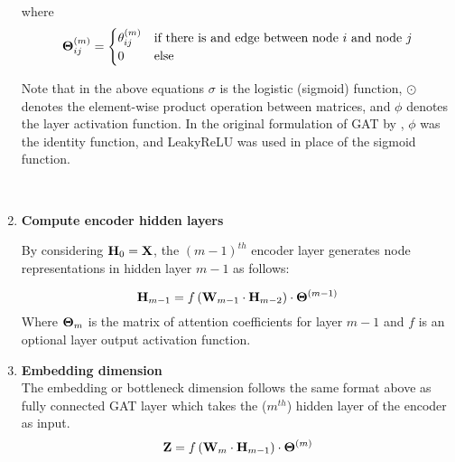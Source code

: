 \documentclass[a4paper,12pt]{article}
\begin{document}
\begin{enumerate}
{					where
					\[ {\bf \Theta}_{ij}^{(m)} = \begin{cases} \theta_{ij}^{(m)} & \text{if there is and edge between node $i$ and node $j$} \\ 0 & \text{else}\end{cases} \]
					
					Note that in the above equations $\sigma$ is the logistic (sigmoid) function, $\odot$ denotes the element-wise product operation between matrices, and $\phi$ denotes the layer activation function. In the original formulation of GAT by \cite{velivckovic2017graph}, $\phi$ was the identity function, and LeakyReLU was used in place of the sigmoid function.}\\
					
				\item[]{\textbf{Compute encoder hidden layers}
					
					By considering ${\bf H}_0 = {\bf X}$, the $(m-1)^{th}$ encoder layer generates node
					representations in hidden layer $m-1$ as follows:
					
					\[ {\bf H}_{m-1} = f\left({\bf W}_{m-1}\cdot {\bf H}_{m-2}\right)\cdot {\bf \Theta}^{(m-1)}\] 
					Where ${\bf \Theta}_{m}$ is the matrix of attention coefficients for layer $m-1$ and $f$ is an optional layer output activation function.
					}
				\newpage
				\item[]{\textbf{Embedding dimension} \\
					The embedding or bottleneck dimension follows the same format above as fully connected GAT layer which takes the ($m^{th}$) hidden layer of the encoder as input.
					\[ {\bf Z} = f\left({\bf W}_m\cdot {\bf H}_{m-1}\right)\cdot {\bf \Theta}^{(m)}\]
					
					} 
			\end{enumerate}
\end{document}
